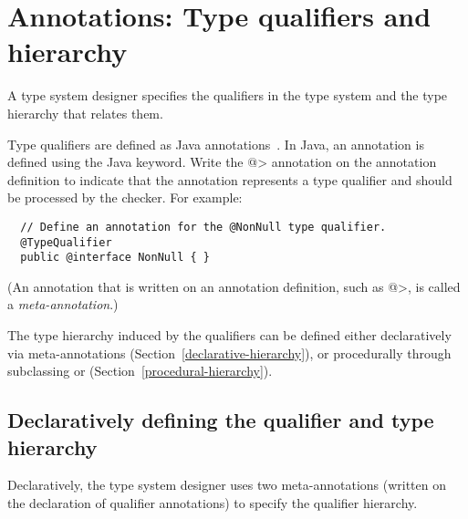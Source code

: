 \section{Annotations: Type qualifiers and hierarchy\label{writing-typequals}}

A type system designer specifies the qualifiers in the type system and
the type hierarchy that relates them.


Type qualifiers are defined as Java annotations~\cite{JSR269}.  In Java, an
annotation is defined using the Java  keyword.
Write the \<@> annotation on the annotation definition
to indicate that the annotation represents a type qualifier
and should be processed by the checker.  For example:

\begin{Verbatim}
  // Define an annotation for the @NonNull type qualifier.
  @TypeQualifier
  public @interface NonNull { }
\end{Verbatim}

\noindent
(An annotation that is written on an annotation
definition, such as \<@>, is called a \emph{meta-annotation}.)


The type hierarchy induced by the qualifiers can be defined either
declaratively via meta-annotations (Section~\ref{declarative-hierarchy}), or procedurally through
subclassing  or
 (Section~\ref{procedural-hierarchy}).


\subsection{Declaratively defining the qualifier and type hierarchy\label{declarative-hierarchy}}

Declaratively, the type system designer uses two meta-annotations (written
on the declaration of qualifier annotations) to specify the qualifier
hierarchy.

